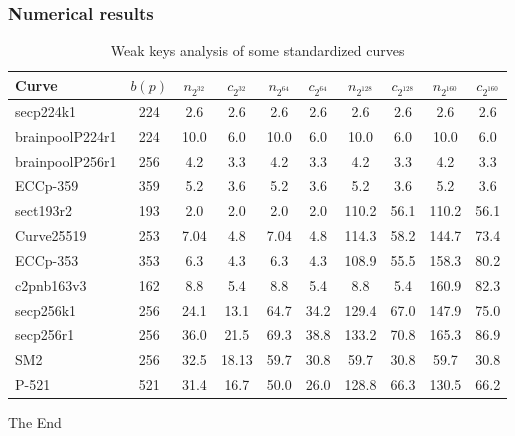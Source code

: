 \documentclass[
	11pt, %
]{beamer}
\theoremstyle{definition}
\theoremstyle{remark}
\begin{document}
\begin{frame}
	\frametitle{Numerical results}
	\begin{table}\tiny
		\caption{Weak keys analysis of some standardized curves}
		\label{weakprime}
		\centering
\begin{tabular}{l c c c c c c c c c}
	\hline\hline
	Curve & $b(p)$ & $n_{2^{32}}$ & $c_{2^{32}}$ & $n_{2^{64}}$ & $c_{2^{64}}$ & $n_{2^{128}}$ & $c_{2^{128}}$& $n_{2^{160}}$ & $c_{2^{160}}$\\
	\hline
	\rowcolor{green}
	secp224k1& 224 & 2.6 & 2.6 & 2.6 & 2.6 & 2.6 & 2.6 & 2.6 & 2.6 \\
	\rowcolor{green}
	brainpoolP224r1& 224 & 10.0 & 6.0 & 10.0 & 6.0& 10.0 & 6.0& 10.0 & 6.0\\
	\rowcolor{green}
	brainpoolP256r1& 256 & 4.2 & 3.3& 4.2 & 3.3 & 4.2 & 3.3 & 4.2 & 3.3  \\
	\rowcolor{green}
	ECCp-359& 359&5.2&3.6&5.2&3.6&5.2&3.6&5.2&3.6\\
	\rowcolor{fuchsia}
	sect193r2 &193& 2.0& 2.0& 2.0& 2.0&110.2&56.1&110.2&56.1\\
	\rowcolor{fuchsia}
	Curve25519 & 253 & 7.04 & 4.8& 7.04 & 4.8&114.3&58.2&144.7&73.4\\
	\rowcolor{fuchsia}
	ECCp-353 & 353&6.3& 4.3& 6.3&4.3&108.9 &55.5 & 158.3&80.2\\
	\rowcolor{fuchsia}
	c2pnb163v3 & 162 & 8.8& 5.4& 8.8&5.4&8.8&5.4&160.9&82.3 \\
	\rowcolor{purple}
	secp256k1 & 256 & 24.1 & 13.1 & 64.7 & 34.2 & 129.4 &67.0 &147.9&75.0\\
	\rowcolor{purple}
	secp256r1 & 256 & 36.0 & 21.5& 69.3&38.8&133.2&70.8&165.3&86.9 \\
	\rowcolor{purple}
	SM2 &256&32.5&18.13&59.7&30.8&59.7&30.8&59.7&30.8\\
	\rowcolor{purple}
	P-521 &  521 & 31.4 & 16.7&50.0&26.0&128.8&66.3&130.5&66.2\\
	
	\hline\hline
\end{tabular}
\end{table}
\end{frame}


\begin{frame}[plain] %
	\begin{center}
		{\Huge The End}	
	\end{center}
\end{frame}

\end{document}

